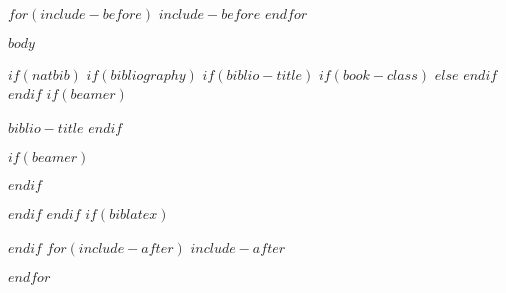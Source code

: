 \documentclass[$if(fontsize)$$fontsize$,$endif$$if(lang)$$babel-lang$,$endif$$if(papersize)$$papersize$paper,$endif$$if(beamer)$ignorenonframetext,$if(handout)$handout,$endif$$if(aspectratio)$aspectratio=$aspectratio$,$endif$$endif$$for(classoption)$$classoption$$sep$,$endfor$]{$documentclass$}
\newif\ifbibliography
\begin{document}
$for(include-before)$
$include-before$
$endfor$

$body$

$if(natbib)$
$if(bibliography)$
$if(biblio-title)$
$if(book-class)$
\renewcommand\bibname{$biblio-title$}
$else$
\renewcommand\refname{$biblio-title$}
$endif$
$endif$
$if(beamer)$
\begin{frame}[allowframebreaks]{$biblio-title$}
\bibliographytrue
$endif$

$if(beamer)$
\end{frame}
$endif$

$endif$
$endif$
$if(biblatex)$

$endif$
$for(include-after)$
$include-after$

$endfor$
\end{document}
